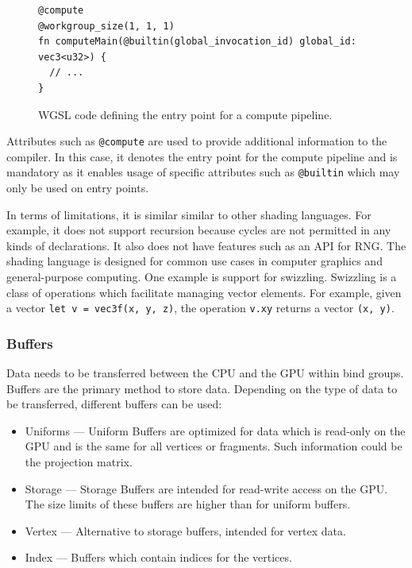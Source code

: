 \begin{figure}[H]
  \begin{lstlisting}[style=wgsl]
@compute
@workgroup_size(1, 1, 1)
fn computeMain(@builtin(global_invocation_id) global_id: vec3<u32>) {
  // ...
}
  \end{lstlisting}
  \caption{\gls{WGSL} code defining the entry point for a compute pipeline.}
  \label{code:computePipelineWgsl}
\end{figure}

Attributes such as \texttt{@compute} are used to provide additional information to the compiler. In this case, it denotes the entry point for the compute pipeline and is mandatory as it enables usage of specific attributes such as \texttt{@builtin} which may only be used on entry points.

In terms of limitations, it is similar similar to other shading languages. For example, it does not support recursion because cycles are not permitted in any kinds of declarations. It also does not have features such as an \gls{API} for \gls{RNG}. The shading language is designed for common use cases in computer graphics and general-purpose computing. One example is support for swizzling. Swizzling is a class of operations which facilitate managing vector elements. For example, given a vector \texttt{let v = vec3f(x, y, z)}, the operation \texttt{v.xy} returns a vector \texttt{(x, y)}.

\subsubsection{Buffers}

Data needs to be transferred between the \gls{CPU} and the \gls{GPU} within bind groups. Buffers are the primary method to store data. Depending on the type of data to be transferred, different buffers can be used:

\begin{itemize}
  \item{Uniforms} — Uniform Buffers are optimized for data which is read-only on the \gls{GPU} and is the same for all vertices or fragments. Such information could be the projection matrix.
  \item{Storage} — Storage Buffers are intended for read-write access on the \gls{GPU}. The size limits of these buffers are higher than for uniform buffers.
  \item{Vertex} — Alternative to storage buffers, intended for vertex data.
  \item{Index} — Buffers which contain indices for the vertices.
\end{itemize}

